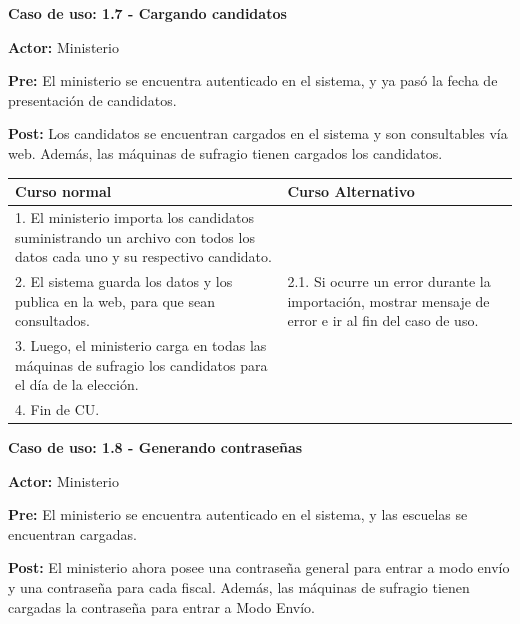 \textbf{Caso de uso: 1.7 - Cargando candidatos}

\textbf{Actor:} Ministerio

\textbf{Pre:} El ministerio se encuentra autenticado en el sistema, y ya pasó la fecha de presentación de candidatos.

\textbf{Post:} Los candidatos se encuentran cargados en el sistema y son consultables vía web. Además, las máquinas de sufragio tienen cargados los candidatos.
\begin{table}[h!]
	
 \begin{tabular}{|p{7.5cm} | p{7.5cm}|} 
 \hline
 \textbf{Curso normal} & \textbf{Curso Alternativo} \\
 \hline
1. El ministerio importa los candidatos suministrando un archivo con todos los datos cada uno y su respectivo candidato. & \\
\hline

2. El sistema guarda los datos y los publica en la web, para que sean consultados. &
2.1. Si ocurre un error durante la importación, mostrar mensaje de error e ir al fin del caso de uso. \\
\hline
3. Luego, el ministerio carga en todas las máquinas de sufragio los candidatos para el día de la elección. & \\
\hline

4. Fin de CU. & \\
\hline
\end{tabular}
\end{table}

\textbf{Caso de uso: 1.8 - Generando contraseñas}

\textbf{Actor:} Ministerio

\textbf{Pre:} El ministerio se encuentra autenticado en el sistema, y las escuelas se encuentran cargadas.

\textbf{Post:} El ministerio ahora posee una contraseña general para entrar a modo envío y una contraseña para cada fiscal. Además, las máquinas de sufragio tienen cargadas la contraseña para entrar a Modo Envío.

